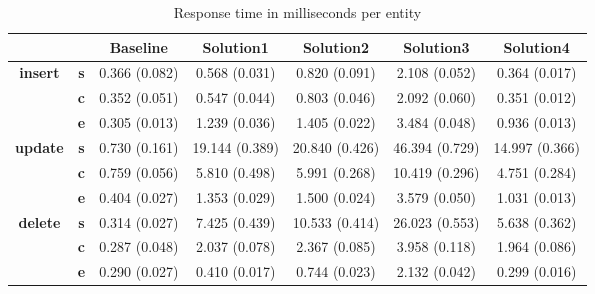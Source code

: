 \begin{table}[h]
\centering
\caption{Response time in milliseconds per entity}\label{t:}
\begin{tabular}{ccccccc}
\toprule
&&\textbf{Baseline} & \textbf{Solution1} & \textbf{Solution2} & \textbf{Solution3} & \textbf{Solution4}\\
\midrule
\multirow{3}{*}{\textbf{insert}} & \textbf{s} & 0.366 (0.082) & 0.568 (0.031) & 0.820 (0.091) & 2.108 (0.052) & 0.364 (0.017)\\
 & \textbf{c} & 0.352 (0.051) & 0.547 (0.044) & 0.803 (0.046) & 2.092 (0.060) & 0.351 (0.012)\\
 & \textbf{e} & 0.305 (0.013) & 1.239 (0.036) & 1.405 (0.022) & 3.484 (0.048) & 0.936 (0.013)\\
\midrule
\multirow{3}{*}{\textbf{update}} & \textbf{s} & 0.730 (0.161) & 19.144 (0.389) & 20.840 (0.426) & 46.394 (0.729) & 14.997 (0.366)\\
 & \textbf{c} & 0.759 (0.056) & 5.810 (0.498) & 5.991 (0.268) & 10.419 (0.296) & 4.751 (0.284)\\
 & \textbf{e} & 0.404 (0.027) & 1.353 (0.029) & 1.500 (0.024) & 3.579 (0.050) & 1.031 (0.013)\\
\midrule
\multirow{3}{*}{\textbf{delete}} & \textbf{s} & 0.314 (0.027) & 7.425 (0.439) & 10.533 (0.414) & 26.023 (0.553) & 5.638 (0.362)\\
 & \textbf{c} & 0.287 (0.048) & 2.037 (0.078) & 2.367 (0.085) & 3.958 (0.118) & 1.964 (0.086)\\
 & \textbf{e} & 0.290 (0.027) & 0.410 (0.017) & 0.744 (0.023) & 2.132 (0.042) & 0.299 (0.016)\\
\bottomrule
\end{tabular}
\end{table}



